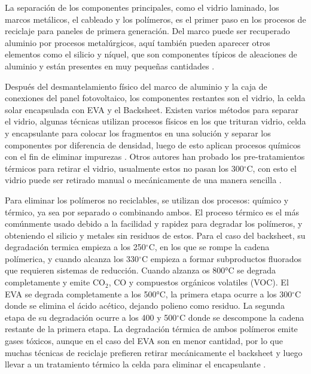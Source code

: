 La separación de los componentes principales, como el vidrio laminado, los marcos metálicos, el cableado y los polímeros, es el primer paso en los procesos de reciclaje para paneles de primera generación. Del marco puede ser recuperado aluminio por procesos metalúrgicos, aquí también pueden aparecer otros elementos como el silicio y níquel, que son
componentes típicos de aleaciones de aluminio y están presentes en muy pequeñas cantidades \citep{Chow2020}.

Después del desmantelamiento físico del marco de aluminio y la caja de conexiones del panel fotovoltaico, los componentes restantes son el vidrio, la celda solar encapsulada con EVA y el Backsheet. Existen varios métodos para separar el vidrio, algunas técnicas utilizan procesos físicos en los que trituran vidrio, celda y encapsulante para colocar los fragmentos en una solución y separar los componentes por diferencia de densidad, luego de esto aplican procesos químicos con el fin de eliminar impurezas \citep{Azeumo2019}. Otros autores han probado los pre-tratamientos térmicos para retirar el vidrio, usualmente estos no pasan los 300$^{\circ}$C, con esto el vidrio puede ser retirado manual o mecánicamente de una manera sencilla \citep{Pagnanelli2019} \citep{Fiandra2019}.  

Para eliminar los polímeros no reciclables, se utilizan dos procesos: químico y térmico, ya sea por separado o combinando ambos. El proceso térmico es el más comúnmente usado debido a la facilidad y rapidez para degradar los polímeros, y obteniendo el silicio y metales sin residuos de estos. Para el caso del backsheet, su degradación termica empieza a los 250$^{\circ}$C, en los que se rompe la cadena polímerica, y cuando alcanza los 330$^{\circ}$C empieza a formar subproductos fluorados que requieren sistemas de reducción. Cuando alzanza os 800°C se degrada completamente y emite CO$_{2}$, CO y compuestos orgánicos volatiles (VOC). El EVA se degrada completamente a los 500°C, la primera etapa ocurre a los 300$^{\circ}$C donde se elimina el ácido acético, dejando polieno como residuo. La segunda etapa de su degradación ocurre a los 400 y 500$^{\circ}$C donde se descompone la cadena restante de la primera etapa. La degradación térmica de ambos polímeros emite gases tóxicos, aunque en el caso del EVA son en menor cantidad, por lo que muchas técnicas de reciclaje prefieren retirar mecánicamente el backsheet y luego llevar a un tratamiento térmico la celda para eliminar el encapsulante \citep{Fiandra2019}. 

